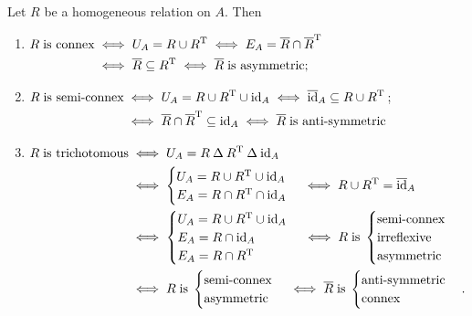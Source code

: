 \begin{lemma}
Let $R$ be a homogeneous relation on $A$. Then
\begin{enumerate}
\item $\begin{aligned}[t]
R \;\text{is connex} &\iff U_A = R\cup R^{\mathrm{T}} \iff E_A = \overline{R}\cap \overline{R}^{\mathrm{T}}\\
&\iff \overline{R}\subseteq R^{\mathrm{T}} \iff \overline{R}\; \text{is asymmetric};
\end{aligned}$
\item $\begin{aligned}[t]
R\; \text{is semi-connex} &\iff U_A = R\cup R^{\mathrm{T}} \cup \operatorname{id}_A \iff \overline{\operatorname{id}}_A\subseteq R\cup R^{\mathrm{T}} \\
&\iff \overline{R}\cap \overline{R}^{\mathrm{T}} \subseteq \operatorname{id}_A \iff \overline{R}\; \text{is anti-symmetric}
\end{aligned}$;
\item $\begin{aligned}[t]
R\; \text{is trichotomous} &\iff U_A = R\mathbin{\Delta} R^{\mathrm{T}} \mathbin{\Delta} \operatorname{id}_A \\
&\iff \begin{cases}
U_A = R\cup R^{\mathrm{T}} \cup \operatorname{id}_A \\
E_A = R\cap R^{\mathrm{T}} \cap \operatorname{id}_A
\end{cases} \iff R\cup R^{\mathrm{T}} = \overline{\operatorname{id}}_A \\
&\iff \begin{cases}
U_A = R\cup R^{\mathrm{T}} \cup \operatorname{id}_A \\
E_A = R\cap \operatorname{id}_A \\
E_A = R \cap R^{\mathrm{T}}
\end{cases} \iff R \; \text{is}\;\begin{cases}
\text{semi-connex} \\ \text{irreflexive} \\ \text{asymmetric}
\end{cases} \\
&\iff R \; \text{is}\;\begin{cases}
\text{semi-connex} \\ \text{asymmetric}
\end{cases} \iff \overline{R} \; \text{is}\;\begin{cases}
\text{anti-symmetric} \\ \text{connex}
\end{cases}.
\end{aligned}$
\end{enumerate}
\end{lemma}

